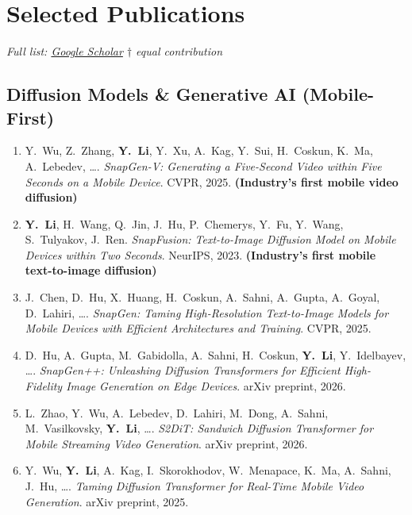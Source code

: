 \documentclass[11pt,letterpaper]{article}
\newcommand{\pub}[4]{%
    \item #1. \textit{#2}. #3, #4.
}
\newcommand{\pubBold}[5]{%
    \item #1. \textit{#2}. #3, #4. \textbf{#5}
}
\begin{document}

\section{Selected Publications}
\small
\textit{Full list: \href{https://scholar.google.com/citations?user=XUj8koUAAAAJ&hl=en}{Google Scholar} 
\hfill $\dagger$ equal contribution}

\vspace{4pt}
\subsection*{Diffusion Models \& Generative AI (Mobile-First)}

\begin{enumerate}

\pubBold{Y.\ Wu, Z.\ Zhang, \textbf{Y.\ Li}, Y.\ Xu, A.\ Kag, Y.\ Sui, H.\ Coskun, K.\ Ma, A.\ Lebedev, \ldots}
    {SnapGen-V: Generating a Five-Second Video within Five Seconds on a Mobile Device}
    {CVPR}{2025}{(Industry's first mobile video diffusion)}

\pubBold{\textbf{Y.\ Li}, H.\ Wang, Q.\ Jin, J.\ Hu, P.\ Chemerys, Y.\ Fu, Y.\ Wang, S.\ Tulyakov, J.\ Ren}
    {SnapFusion: Text-to-Image Diffusion Model on Mobile Devices within Two Seconds}
    {NeurIPS}{2023}{(Industry's first mobile text-to-image diffusion)}

\pub{J.\ Chen, D.\ Hu, X.\ Huang, H.\ Coskun, A.\ Sahni, A.\ Gupta, A.\ Goyal, D.\ Lahiri, \ldots}
    {SnapGen: Taming High-Resolution Text-to-Image Models for Mobile Devices with Efficient Architectures and Training}
    {CVPR}{2025}

\pub{D.\ Hu, A.\ Gupta, M.\ Gabidolla, A.\ Sahni, H.\ Coskun, \textbf{Y.\ Li}, Y.\ Idelbayev, \ldots}
    {SnapGen++: Unleashing Diffusion Transformers for Efficient High-Fidelity Image Generation on Edge Devices}
    {arXiv preprint}{2026}

\pub{L.\ Zhao, Y.\ Wu, A.\ Lebedev, D.\ Lahiri, M.\ Dong, A.\ Sahni, M.\ Vasilkovsky, \textbf{Y.\ Li}, \ldots}
    {S2DiT: Sandwich Diffusion Transformer for Mobile Streaming Video Generation}
    {arXiv preprint}{2026}

\pub{Y.\ Wu, \textbf{Y.\ Li}, A.\ Kag, I.\ Skorokhodov, W.\ Menapace, K.\ Ma, A.\ Sahni, J.\ Hu, \ldots}
    {Taming Diffusion Transformer for Real-Time Mobile Video Generation}
    {arXiv preprint}{2025}

\end{enumerate}
\end{document}

